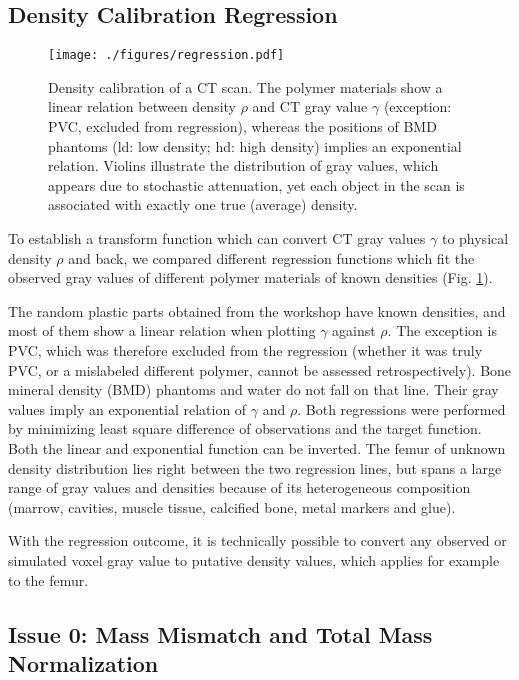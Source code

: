 \subsection{Density Calibration Regression}
\label{sec:org114c751}
\begin{figure}[htbp]
\centering
\texttt{[image: ./figures/regression.pdf]}
\caption{\label{fig:density_calibration}Density calibration of a CT scan. The polymer materials show a linear relation between density \(\rho\) and CT gray value \(\gamma\) (exception: PVC, excluded from regression), whereas the positions of BMD phantoms (ld: low density; hd: high density) implies an exponential relation. Violins illustrate the distribution of gray values, which appears due to stochastic attenuation, yet each object in the scan is associated with exactly one true (average) density.}
\end{figure}

To establish a transform function which can convert CT gray values \(\gamma\) to physical density \(\rho\) and back, we compared different regression functions which fit the observed gray values of different polymer materials of known densities (Fig. \ref{fig:density_calibration}).

The random plastic parts obtained from the workshop have known densities, and most of them show a linear relation when plotting \(\gamma\) against \(\rho\).
The exception is PVC, which was therefore excluded from the regression (whether it was truly PVC, or a mislabeled different polymer, cannot be assessed retrospectively).
Bone mineral density (BMD) phantoms and water do not fall on that line.
Their gray values imply an exponential relation of \(\gamma\) and \(\rho\).
Both regressions were performed by minimizing least square difference of observations and the target function.
Both the linear and exponential function can be inverted.
The femur of unknown density distribution lies right between the two regression lines, but spans a large range of gray values and densities because of its heterogeneous composition (marrow, cavities, muscle tissue, calcified bone, metal markers and glue).

With the regression outcome, it is technically possible to convert any observed or simulated voxel gray value to putative density values, which applies for example to the femur.


\subsection{Issue 0: Mass Mismatch and Total Mass Normalization}
\label{sec:org6b68bcc}


